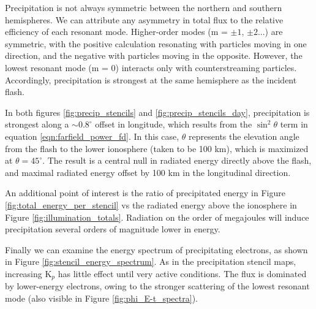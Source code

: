 Precipitation is not always symmetric between the northern and southern hemispheres. We can attribute any asymmetry in total flux to the relative efficiency of each resonant mode. Higher-order modes (m = $\pm 1$, $\pm 2$...) are symmetric, with the positive calculation resonating with particles moving in one direction, and the negative with particles moving in the opposite. However, the lowest resonant mode (m = 0) interacts only with counterstreaming particles. Accordingly, precipitation is strongest at the same hemisphere as the incident flash.

In both figures \ref{fig:precip_stencils} and \ref{fig:precip_stencils_day}, precipitation is strongest along a $\sim 0.8^\circ$ offset in longitude, which results from the $\sin^2\theta$ term in equation \eqref{eqn:farfield_power_fd}. In this case, $\theta$ represents the elevation angle from the flash to the lower ionosphere (taken to be 100 km), which is maximized at $\theta = 45^\circ$. The result is a central null in radiated energy directly above the flash, and maximal radiated energy offset by 100 km in the longitudinal direction.

An additional point of interest is the ratio of precipitated energy in Figure \ref{fig:total_energy_per_stencil} vs the radiated energy above the ionosphere in Figure \ref{fig:illumination_totals}. Radiation on the order of megajoules will induce precipitation several orders of magnitude lower in energy. 

Finally we can examine the energy spectrum of precipitating electrons, as shown in Figure \ref{fig:stencil_energy_spectrum}. As in the precipitation stencil maps, increasing K$_p$ has little effect until very active conditions. The flux is dominated by lower-energy electrons, owing to the stronger scattering of the lowest resonant mode (also visible in Figure \ref{fig:phi_E-t_spectra}).

